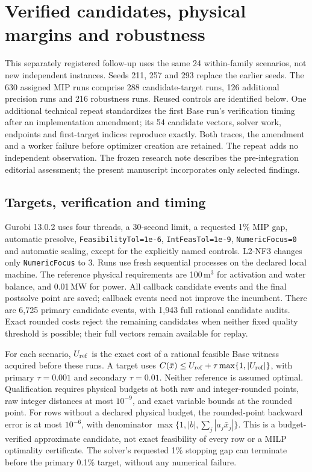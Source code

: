 \section{Verified candidates, physical margins and robustness}
\label{sec:orf-verified-followup}
This separately registered follow-up uses the same 24 within-family scenarios,
not new independent instances. Seeds 211, 257 and 293 replace the earlier seeds.
The 630 assigned MIP runs comprise 288 candidate-target runs, 126 additional
precision runs and 216 robustness runs. Reused controls are identified below.
One additional technical repeat standardizes the first Base run's verification
timing after an implementation amendment; its 54 candidate vectors, solver work,
endpoints and first-target indices reproduce exactly. Both traces, the amendment
and a worker failure before optimizer creation are retained. The repeat adds no
independent observation. The frozen research note describes the pre-integration
editorial assessment; the present manuscript incorporates only selected findings.

\subsection{Targets, verification and timing}
Gurobi 13.0.2 uses four threads, a 30-second limit, a requested 1\% MIP gap,
automatic presolve, \texttt{FeasibilityTol=1e-6},
\texttt{IntFeasTol=1e-9}, \texttt{NumericFocus=0} and automatic scaling, except
for the explicitly named controls. L2-NF3 changes only \texttt{NumericFocus} to 3.
Runs use fresh sequential processes on the declared local machine.
The reference physical requirements are 100\,m$^3$ for activation and water
balance, and 0.01\,MW for power.
All callback candidate events and the final postsolve point are saved;
callback events need not improve the incumbent. There are 6,725 primary
candidate events, with 1,943 full rational candidate audits. Exact rounded costs
reject the remaining candidates when neither fixed quality threshold is possible;
their full vectors remain available for replay.

For each scenario, $U_{\rm ref}$ is the exact cost of a rational feasible Base
witness acquired before these runs. A target uses
$C(\bar x)\le U_{\rm ref}+\tau\max\{1,|U_{\rm ref}|\}$, with primary
$\tau=0.001$ and secondary $\tau=0.01$. Neither reference is assumed optimal.
Qualification requires physical budgets at both raw and integer-rounded points,
raw integer distances at most $10^{-9}$, and exact variable bounds at the rounded
point. For rows without a declared physical budget, the rounded-point backward
error is at most $10^{-6}$, with denominator
$\max\{1,|b|,\sum_j|a_j\bar x_j|\}$.
This is a budget-verified approximate candidate, not exact feasibility of every
row or a MILP optimality certificate. The solver's requested 1\% stopping gap
can terminate before the primary 0.1\% target, without any numerical failure.

